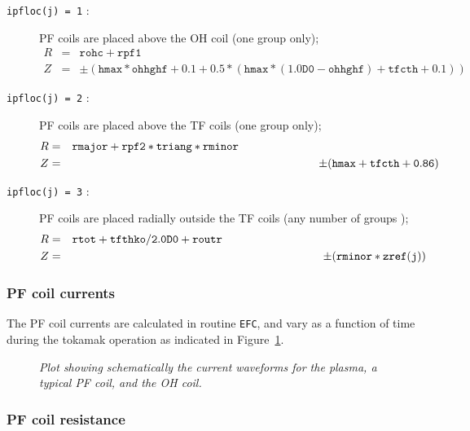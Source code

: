 \documentclass[11pt,a4paper]{report}
\begin{document}
\begin{description} %

\item [\texttt{ipfloc(j) = 1} :]  PF coils are placed above the OH coil (one
group only);
\begin{eqnarray*}
R & = & \mathtt{rohc + rpf1} \\
Z & = & \pm
\mathtt{( hmax*ohhghf + 0.1 + 0.5*( hmax*(1.0D0-ohhghf)+tfcth+0.1) )}
\end{eqnarray*}

\item [\texttt{ipfloc(j) = 2} :]  PF coils are placed above the TF coils (one
group only);
\begin{eqnarray*}
R & = & \mathtt{rmajor + rpf2*triang*rminor} \hspace{62mm} \\
Z & = & \pm (\mathtt{hmax + tfcth + 0.86})
\end{eqnarray*}

\item [\texttt{ipfloc(j) = 3} :]  PF coils are placed radially outside the TF
coils (any number of groups );
\begin{eqnarray*}
R & = & \mathtt{rtot + tfthko/2.0D0 + routr} \hspace{63mm}\\
Z & = & \pm(\mathtt{rminor*zref(j)})
\end{eqnarray*}

\end{description}

\subsubsection{PF coil currents}

The PF coil currents are calculated in routine \texttt{EFC}, and vary as a
function of time during the tokamak operation as indicated in
Figure~\ref{fig:current_vs_time}.

\begin{figure}[tbph]
\caption[Coil and plasma current waveforms]
{\label{fig:current_vs_time}
  \textit{Plot showing schematically the current waveforms for the plasma, a
    typical PF coil, and the OH coil.}
}
\end{figure}

\subsubsection{PF coil resistance}
\end{document}

